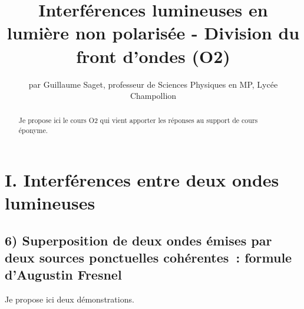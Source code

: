 \documentclass{article}
\title{\huge{\textbf{Interférences lumineuses en lumière non polarisée - Division du front d'ondes (O2)}}}
\author{par Guillaume Saget, professeur de Sciences Physiques en MP, Lycée Champollion}
\date{}
\begin{document}
\maketitle


\begin{abstract}
Je propose ici le cours O2 qui vient apporter les réponses au
support de cours éponyme.
\end{abstract}


\section*{I. Interférences entre deux ondes lumineuses}
\subsection*{6) Superposition de deux ondes émises par deux sources ponctuelles cohérentes : formule d'Augustin Fresnel}
Je propose ici deux démonstrations.
\end{document}
